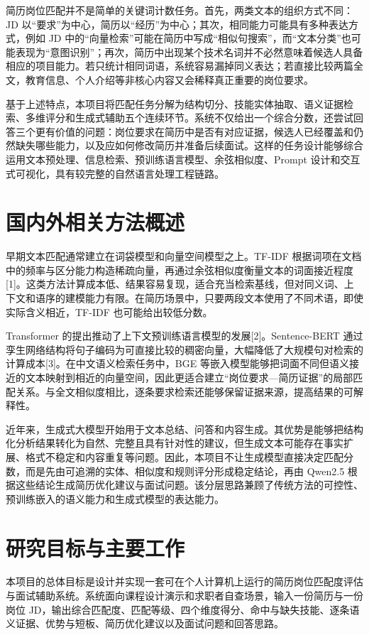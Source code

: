 \documentclass[UTF8,zihao=-4,a4paper,oneside]{ctexrep}
\begin{document}
简历岗位匹配并不是简单的关键词计数任务。首先，两类文本的组织方式不同：JD 以“要求”为中心，简历以“经历”为中心；其次，相同能力可能具有多种表达方式，例如 JD 中的“向量检索”可能在简历中写成“相似句搜索”，而“文本分类”也可能表现为“意图识别”；再次，简历中出现某个技术名词并不必然意味着候选人具备相应的项目能力。若只统计相同词语，系统容易漏掉同义表达；若直接比较两篇全文，教育信息、个人介绍等非核心内容又会稀释真正重要的岗位要求。


基于上述特点，本项目将匹配任务分解为结构切分、技能实体抽取、语义证据检索、多维评分和生成式辅助五个连续环节。系统不仅给出一个综合分数，还尝试回答三个更有价值的问题：岗位要求在简历中是否有对应证据，候选人已经覆盖和仍然缺失哪些能力，以及应如何修改简历并准备后续面试。这样的任务设计能够综合运用文本预处理、信息检索、预训练语言模型、余弦相似度、Prompt 设计和交互式可视化，具有较完整的自然语言处理工程链路。


\section{国内外相关方法概述}


早期文本匹配通常建立在词袋模型和向量空间模型之上。TF-IDF 根据词项在文档中的频率与区分能力构造稀疏向量，再通过余弦相似度衡量文本的词面接近程度[1]。这类方法计算成本低、结果容易复现，适合充当检索基线，但对同义词、上下文和语序的建模能力有限。在简历场景中，只要两段文本使用了不同术语，即使实际含义相近，TF-IDF 也可能给出较低分数。


Transformer 的提出推动了上下文预训练语言模型的发展[2]。Sentence-BERT 通过孪生网络结构将句子编码为可直接比较的稠密向量，大幅降低了大规模句对检索的计算成本[3]。在中文语义检索任务中，BGE 等嵌入模型能够把词面不同但语义接近的文本映射到相近的向量空间，因此更适合建立“岗位要求—简历证据”的局部匹配关系。与全文相似度相比，逐条要求检索还能够保留证据来源，提高结果的可解释性。


近年来，生成式大模型开始用于文本总结、问答和内容生成。其优势是能够把结构化分析结果转化为自然、完整且具有针对性的建议，但生成文本可能存在事实扩展、格式不稳定和内容重复等问题。因此，本项目不让生成模型直接决定匹配分数，而是先由可追溯的实体、相似度和规则评分形成稳定结论，再由 Qwen2.5 根据这些结论生成简历优化建议与面试问题。该分层思路兼顾了传统方法的可控性、预训练嵌入的语义能力和生成式模型的表达能力。


\section{研究目标与主要工作}


本项目的总体目标是设计并实现一套可在个人计算机上运行的简历岗位匹配度评估与面试辅助系统。系统面向课程设计演示和求职者自查场景，输入一份简历与一份岗位 JD，输出综合匹配度、匹配等级、四个维度得分、命中与缺失技能、逐条语义证据、优势与短板、简历优化建议以及面试问题和回答思路。
\end{document}

